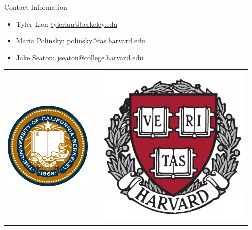\documentclass[final]{beamer}
\newlength{\onecolwid}
\begin{document}
\begin{frame}[t]
\begin{columns}[t]
\begin{column}{\onecolwid}
\begin{alertblock}{Contact Information}

\footnotesize

\begin{itemize}
\item Tyler Lau: \href{mailto:tylerlau@berkeley.edu}{tylerlau@berkeley.edu}
\item Maria Polinsky: \href{mailto:polinsky@fas.harvard.edu}{polinsky@fas.harvard.edu}
\item Jake Seaton: \href{mailto:jseaton@college.harvard.edu}{jseaton@college.harvard.edu}
\end{itemize}

\end{alertblock}

\begin{center}
\begin{tabular}{ccc}
\includegraphics[width=0.3\linewidth]{UC_Berkeley_Seal_80px.jpg} & \hfill & \includegraphics[width=0.3\linewidth]{harvard_shield_wreath-284x300.png}
\end{tabular}
\end{center}


\end{column} %

\end{columns} %

\end{frame} %
\end{document}

